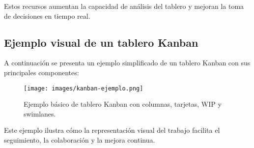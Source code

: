 Estos recursos aumentan la capacidad de análisis del tablero y mejoran la toma de decisiones en tiempo real.

\subsection{Ejemplo visual de un tablero Kanban}

A continuación se presenta un ejemplo simplificado de un tablero Kanban con sus principales componentes:

\begin{figure}[H]
\centering
\texttt{[image: images/kanban-ejemplo.png]}
\caption{Ejemplo básico de tablero Kanban con columnas, tarjetas, WIP y swimlanes.}
\end{figure}

Este ejemplo ilustra cómo la representación visual del trabajo facilita el seguimiento, la colaboración y la mejora continua.

